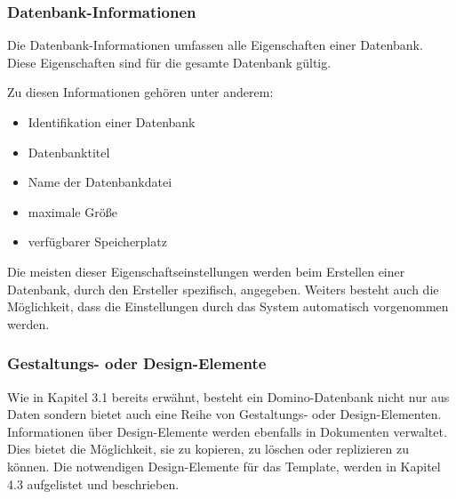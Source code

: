 %
%

\subsubsection{Datenbank-Informationen}
\label{sec:3dominoDB}

Die Datenbank-Informationen umfassen alle Eigenschaften einer Datenbank. Diese Eigenschaften sind für die gesamte Datenbank gültig.
\begin{flushleft}
Zu diesen Informationen gehören unter anderem:
\end{flushleft}
\begin{itemize}
\item Identifikation einer  Datenbank
\item Datenbanktitel
\item Name der Datenbankdatei
\item maximale Größe
\item verfügbarer Speicherplatz 
\end{itemize}
Die meisten dieser Eigenschaftseinstellungen werden beim Erstellen einer Datenbank, durch den Ersteller spezifisch, angegeben. 
Weiters besteht auch die Möglichkeit, dass die Einstellungen durch das System automatisch vorgenommen werden.

\subsubsection{Gestaltungs- oder Design-Elemente}
\label{sec:3dominoDB}

Wie in Kapitel 3.1 bereits erwähnt, besteht ein Domino-Datenbank nicht nur aus Daten sondern bietet auch eine Reihe von Gestaltungs- oder Design-Elementen.
Informationen über Design-Elemente werden ebenfalls in Dokumenten verwaltet. Dies bietet die Möglichkeit, sie zu kopieren, zu löschen oder replizieren zu
können. Die notwendigen Design-Elemente für das Template, werden in Kapitel 4.3 aufgelistet und beschrieben. 

